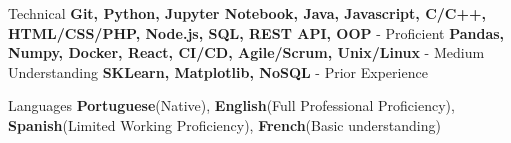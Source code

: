 
\begin{cvskills}
  \cvskill
    {Technical} %
    {\textbf{Git, Python, Jupyter Notebook, Java, Javascript, C/C++, HTML/CSS/PHP, Node.js, SQL, REST API, OOP} - Proficient \break \textbf{Pandas, Numpy, Docker, React, CI/CD, Agile/Scrum, Unix/Linux} - Medium Understanding \break \textbf{SKLearn, Matplotlib, NoSQL} - Prior Experience} %

  \cvskill
    {Languages} %
    {\textbf{Portuguese}(Native), \textbf{English}(Full Professional Proficiency), \textbf{Spanish}(Limited Working Proficiency), \textbf{French}(Basic understanding) } %

\end{cvskills}